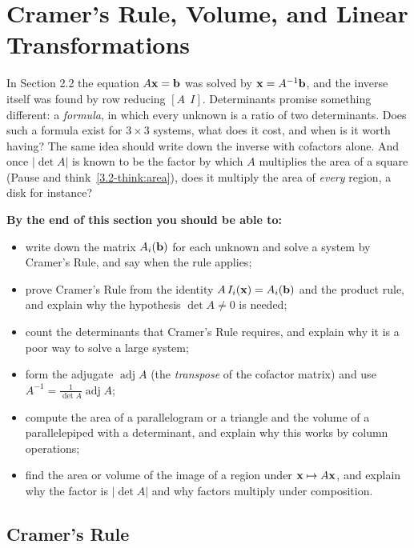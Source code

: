 \documentclass[11pt]{article}
\begin{document}
\section{Cramer's Rule, Volume, and Linear Transformations}

\begin{guide}
In Section 2.2 the equation $A\mathbf{x}=\mathbf{b}$ was solved by $\mathbf{x}=A^{-1}\mathbf{b}$, and the inverse itself was found by row reducing $[A\ \ I]$. Determinants promise something different: a \emph{formula}, in which every unknown is a ratio of two determinants. Does such a formula exist for $3\times3$ systems, what does it cost, and when is it worth having? The same idea should write down the inverse with cofactors alone. And once $|\det A|$ is known to be the factor by which $A$ multiplies the area of a square (Pause and think~\ref{3.2-think:area}), does it multiply the area of \emph{every} region, a disk for instance?
\end{guide}

\textbf{By the end of this section you should be able to:}
\begin{itemize}
  \item write down the matrix $A_i(\mathbf{b})$ for each unknown and solve a system by Cramer's Rule, and say when the rule applies;
  \item prove Cramer's Rule from the identity $A\,I_i(\mathbf{x})=A_i(\mathbf{b})$ and the product rule, and explain why the hypothesis $\det A\neq0$ is needed;
  \item count the determinants that Cramer's Rule requires, and explain why it is a poor way to solve a large system;
  \item form the adjugate $\operatorname{adj}A$ (the \emph{transpose} of the cofactor matrix) and use $A^{-1}=\frac1{\det A}\operatorname{adj}A$;
  \item compute the area of a parallelogram or a triangle and the volume of a parallelepiped with a determinant, and explain why this works by column operations;
  \item find the area or volume of the image of a region under $\mathbf{x}\mapsto A\mathbf{x}$, and explain why the factor is $|\det A|$ and why factors multiply under composition.
\end{itemize}

\subsection*{Cramer's Rule}
\end{document}
